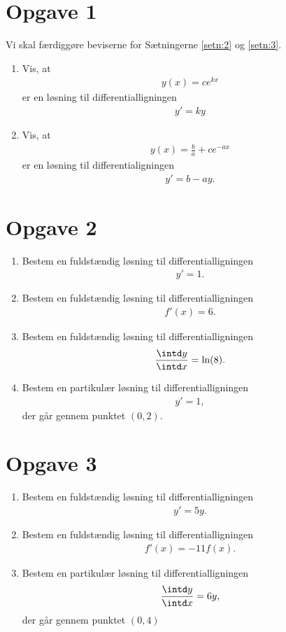 \section*{Opgave 1}
Vi skal færdiggøre beviserne for Sætningerne \ref{setn:2} og \ref{setn:3}.
\begin{enumerate}[label=\roman*)]
	\item Vis, at 
	\begin{align*}
		y(x) = ce^{kx}
	\end{align*}
	er en løsning til differentialligningen
	\begin{align*}
		y' = ky
	\end{align*}
	\item Vis, at 
	\begin{align*}
		y(x) = \frac{b}{a} + ce^{-ax}
	\end{align*}
	er en løsning til differentialigningen 
	\begin{align*}
		y' = b-ay.
	\end{align*}
\end{enumerate}
\section*{Opgave 2}
\begin{enumerate}[label=\roman*)]
	\item Bestem en fuldstændig løsning til differentialligningen
	\begin{align*}
		y' = 1.
	\end{align*}
	\item Bestem en fuldstændig løsning til differentialligningen
	\begin{align*}
		f'(x) = 6.
	\end{align*}
	\item Bestem en fuldstændig løsning til differentialligningen
	\begin{align*}
		\frac{\intd y}{\intd x} = \ln(8).
	\end{align*}
	\item Bestem en partikulær løsning til differentialligningen 
	\begin{align*}
		y' = 1,
	\end{align*}
	der går gennem punktet $(0,2)$.
\end{enumerate}
\section*{Opgave 3}
\begin{enumerate}[label=\roman*)]
	\item Bestem en fuldstændig løsning til differentialligningen
	\begin{align*}
		y' = 5y.
	\end{align*} 
	\item Bestem en fuldstændig løsning til differentialligningen
	\begin{align*}
		f'(x) = -11f(x).
	\end{align*}
	\item Bestem en partikulær løsning til differentialligningen
	\begin{align*}
		\frac{\intd y}{\intd x} = 6y,
	\end{align*}
	der går gennem punktet $(0,4)$
\end{enumerate}

